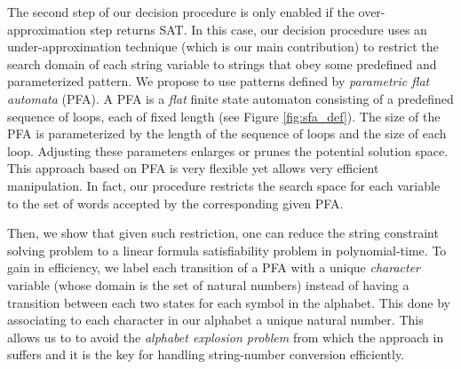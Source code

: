 \documentclass[sigplan,review,anonymous]{acmart}\settopmatter{printfolios=true,printccs=false,printacmref=false}
\begin{document}
The second step of our decision procedure is only enabled if the over-approximation step returns SAT. In this case, our decision procedure uses an under-approximation technique (which is  our main contribution) to restrict the search domain of each string variable to strings that obey some predefined and parameterized pattern.  We propose to use patterns defined by \emph{parametric flat automata} (PFA). A PFA is a {\em flat} finite state automaton consisting of a predefined sequence of loops, each of fixed length (see Figure \ref{fig:sfa_def}). The size of the PFA is parameterized by the length of the sequence of loops and the size of each loop. Adjusting these parameters enlarges or prunes the potential solution space. This approach based on PFA is very flexible yet allows very efficient manipulation. In fact, our procedure restricts the search space for each variable to the set of words accepted by the corresponding given PFA. 


Then, we show that given such restriction, one can  reduce the string constraint solving problem to a linear formula satisfiability problem in polynomial-time. To gain in efficiency, we label each transition  of a PFA with a unique \emph{character} variable (whose domain is the set of natural numbers) instead of having a transition between each two states for each symbol in the alphabet.  This done by associating to each character in our alphabet a unique natural number. This allows us to  to avoid the \textit{alphabet explosion problem} from which the approach in~\cite{abdulla2017flatten} suffers and it is  the key for handling string-number conversion efficiently. 
\end{document}

